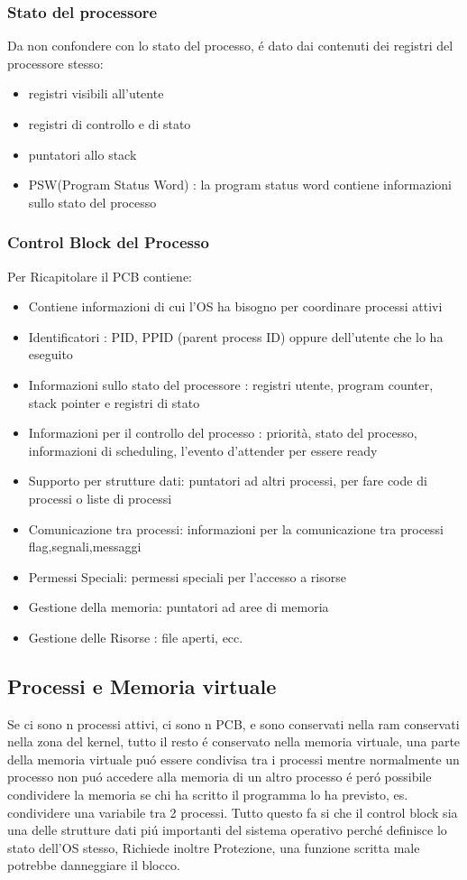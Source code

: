\subsubsection{Stato del processore}
Da non confondere con lo stato del processo, é dato dai contenuti dei registri del processore stesso:
\begin{itemize}
    \item registri visibili all'utente
    \item registri di controllo e di stato
    \item puntatori allo stack
    \item PSW(Program Status Word) : la program status word contiene informazioni sullo stato del processo
    \end{itemize}
\subsubsection{Control Block del Processo}
Per Ricapitolare il PCB contiene:
\begin{itemize}
    \item Contiene informazioni di cui l'OS ha bisogno per coordinare processi attivi
    \item Identificatori : PID, PPID (parent process ID) oppure dell'utente che lo ha eseguito
    \item Informazioni sullo stato del processore : registri utente, program counter, stack pointer e registri di stato
    \item Informazioni per il controllo del processo : priorità, stato del processo, informazioni di scheduling, l'evento d'attender per essere ready
    \item Supporto per strutture dati: puntatori ad altri processi, per fare code di processi o liste di processi
    \item Comunicazione tra processi: informazioni per la comunicazione tra processi flag,segnali,messaggi
    \item Permessi Speciali: permessi speciali per l'accesso a risorse
    \item Gestione della memoria: puntatori ad aree di memoria
    \item Gestione delle Risorse : file aperti, ecc.
\end{itemize}
\subsection{Processi e Memoria virtuale}
Se ci sono n processi attivi, ci sono n PCB, e sono conservati nella ram conservati nella zona del kernel, tutto il
resto é conservato nella memoria virtuale, una parte della memoria virtuale puó essere condivisa tra i processi mentre
normalmente un processo non puó accedere alla memoria di un altro processo é peró possibile
condividere la memoria se chi ha scritto il programma lo ha previsto, es. condividere una variabile tra 2 processi.
Tutto questo fa si che il control block sia una delle strutture dati piú importanti del sistema operativo perché definisce lo stato dell'OS stesso,
Richiede inoltre Protezione, una funzione scritta male potrebbe danneggiare il blocco.
